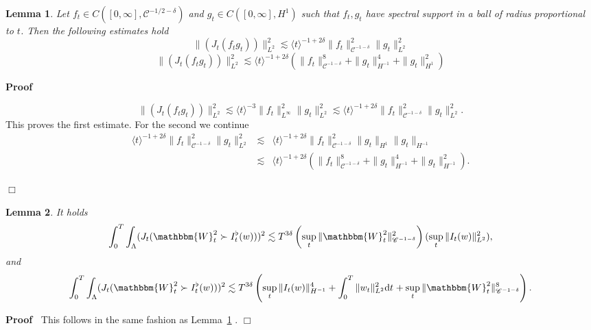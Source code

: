 \documentclass[11pt]{article}
\newcommand{\mathd}{\mathrm{d}}
\newenvironment{proof}{\noindent\textbf{Proof\ }}{\hspace*{\fill}$\Box$\medskip}
\newtheorem{lemma}{Lemma}
\newcommand{\VV}{\mathscr{C}}
\begin{document}
\begin{lemma}
  \label{analyticestimate4}Let $f_t \in C \left( [0, \infty], \VV^{- 1 / 2 -
  \delta} \right)$ and $g_t \in C ([0, \infty], H^1)$ such that $f_t, g_t$
  have spectral support in a ball of radius proportional to $t$. Then the
  following estimates hold
  \[ \| (J_t (f_t g_t)) \|_{L^2}^2 \lesssim \langle t \rangle^{- 1 + 2
     \delta} \| f_t \|_{\VV^{- 1 - \delta}}^2 \| g_t \|^2_{L^2} \]
  \[ \| (J_t (f_t g_t)) \|_{L^2}^2 \lesssim \langle t \rangle^{- 1 + 2 \delta}
     \left( \| f_t \|^8_{\VV^{- 1 - \delta}} + \| g_t \|^4_{H^{- 1}} + \| g_t
     \|^2_{H^1} \right) \]
\end{lemma}

\begin{proof}
  
  \[ \| (J_t (f_t g_t)) \|_{L^2}^2 \lesssim \langle t \rangle^{- 3} \| f_t
     \|_{L^{\infty}}^2 \| g_t \|^2_{L^2} \lesssim \langle t \rangle^{- 1 + 2
     \delta} \| f_t \|_{\VV^{- 1 - \delta}}^2 \| g_t \|^2_{L^2} . \]
  This proves the first estimate. For the second we continue
  \begin{eqnarray*}
    \langle t \rangle^{- 1 + 2 \delta} \| f_t \|_{\VV^{- 1 - \delta}}^2 \| g_t
    \|^2_{L^2} & \lesssim & \langle t \rangle^{- 1 + 2 \delta} \| f_t
    \|_{\VV^{- 1 - \delta}}^2 \| g_t \|_{H^1} \| g_t \|_{H^{- 1}}\\
    & \lesssim & \langle t \rangle^{- 1 + 2 \delta} \left( \| f_t \|_{\VV^{-
    1 - \delta}}^8 + \| g_t \|^4_{H^{- 1}} + \| g_t \|^2_{H^{- 1}} \right) .
  \end{eqnarray*}
  
\end{proof}

\begin{lemma}
  \label{analyticestimate5}It holds
  \[ \int^T_0 \int_{\Lambda} (J_t (\mathbbm{W}_t^2 \succ I^{\flat}_t (w)))^2
     \lesssim T^{3 \delta} \left( \sup_t \| \mathbbm{W}_t^2 \|^2_{\VV^{- 1 -
     \delta}} \right) (\sup_t \| I_t (w) \|^2_{L^2}), \]
  and
  \[ \int^T_0 \int_{\Lambda} (J_t (\mathbbm{W}_t^2 \succ I^{\flat}_t (w)))^2
     \lesssim T^{3 \delta} \left( \sup_t \| I_t (w) \|^4_{H^{- 1}} + \int^T_0
     \| w_t \|^2_{L^2} \mathd t_{} + \sup_t \| \mathbbm{W}_t^2 \|^8_{\VV^{- 1
     - \delta}} \right) . \]
  
\end{lemma}

\begin{proof}
  This follows in the same fashion as Lemma~\ref{analyticestimate4} .
\end{proof}
\end{document}
